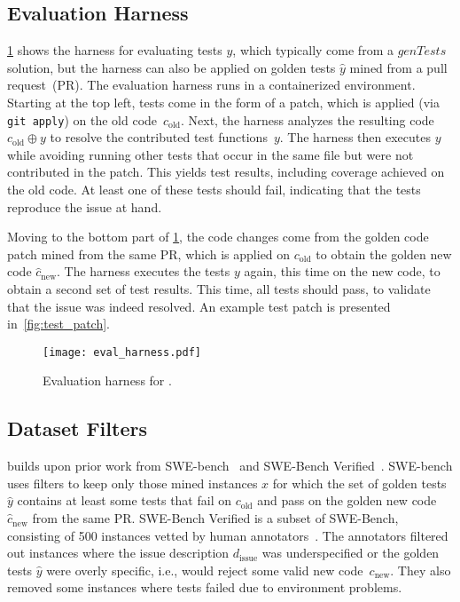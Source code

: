 \subsection{\tdd Evaluation Harness}\label{sec:eval_harness}

\cref{fig:eval_harness} shows the harness for evaluating tests $y$, which
typically come from a $\mathit{genTests}$ solution, but the harness can also be
applied on golden tests $\hat{y}$ mined from a pull request~(PR).  The
evaluation harness runs in a containerized environment.  Starting at the top
left, tests come in the form of a patch, which is applied (via \texttt{\small
  git\,apply}) on the old code~$c_\mathrm{old}$.  Next, the harness analyzes the
resulting code $c_\mathrm{old}\oplus y$ to resolve the contributed test
functions~$y$.  The harness then executes $y$ while avoiding running other tests
that occur in the same file but were not contributed in the patch.  This yields
test results, including coverage achieved on the old code.  At least one of
these tests should fail, indicating that the tests reproduce the
issue at hand.

Moving to the bottom part of \cref{fig:eval_harness}, the code changes come from
the golden code patch mined from the same PR, which is applied on
$c_\mathrm{old}$ to obtain the golden new code $\hat{c}_\mathrm{new}$.  The harness
executes the tests $y$ again, this time on the new code, to obtain a second set
of test results.  This time, all tests should pass, to validate that the issue
was indeed resolved. An example test patch is presented
in~\cref{fig:test_patch}.


\begin{figure}[h]
  \centerline{\texttt{[image: eval\_harness.pdf]}}
  \vspace{-.3cm}
  \caption{\label{fig:eval_harness}Evaluation harness for \tdd.}
  \vspace{-.3cm}
\end{figure}


\subsection{Dataset Filters}\label{sec:tdd_filters}

\tdd builds upon prior work from SWE-bench~\cite{jimenezswe} and SWE-Bench Verified~\cite{chowdhury_et_al_2024}.  SWE-bench uses filters to keep
only those mined instances $x$ for which the set of golden tests $\hat{y}$ contains at least some tests
that fail on $c_\mathrm{old}$ and pass on the golden new code
$\hat{c}_\mathrm{new}$ from the same PR.  SWE-Bench Verified is a subset of
SWE-Bench, consisting of 500 instances vetted by human
annotators~\cite{chowdhury_et_al_2024}.  The annotators filtered out instances
where the issue description $d_\mathrm{issue}$ was underspecified or the golden
tests $\hat{y}$ were overly specific, i.e., would reject some valid new
code~$c_\mathrm{new}$.  They also removed some instances where tests failed due
to environment problems. %

